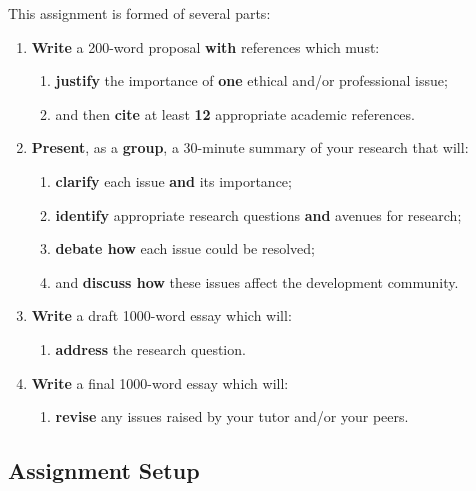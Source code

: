 \documentclass{../../fal_assignment}
\newcommand{\proposalWordCount}{200}
\newcommand{\essayWordCount}{1000}
\newcommand{\presentationMinutes}{30}
\newcommand{\minReferenceCount}{12 }
\begin{document}
This assignment is formed of several parts:

\begin{enumerate}[label=(\Alph*)]
    \item \textbf{Write} a \proposalWordCount-word proposal \textbf{with} references which must:
    	\begin{enumerate}[label=\roman*.]
    		\item \textbf{justify} the importance of \textbf{one} ethical and/or professional issue;
    		\item and then \textbf{cite} at least \textbf{\minReferenceCount} appropriate academic references.
	\end{enumerate}
    \item \textbf{Present}, as a \textbf{group}, a \presentationMinutes-minute summary of your research that will:
    	\begin{enumerate}[label=\roman*.]
    		\item \textbf{clarify} each issue \textbf{and} its importance;
    		\item \textbf{identify} appropriate research questions \textbf{and} avenues for research;
    		\item \textbf{debate how} each issue could be resolved;
    		\item and \textbf{discuss how} these issues affect the development community.
	\end{enumerate}
    \item \textbf{Write} a draft \essayWordCount-word essay which will:
    	\begin{enumerate}[label=\roman*.]
    		\item  \textbf{address} the research question.
	\end{enumerate}
    \item \textbf{Write} a final \essayWordCount-word essay which will:
    	\begin{enumerate}[label=\roman*.]
    		\item \textbf{revise} any issues raised by your tutor and/or your peers.
	\end{enumerate}
\end{enumerate}


\subsection*{Assignment Setup}
\end{document}
